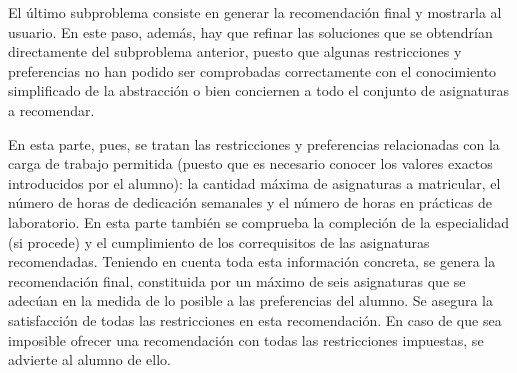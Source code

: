El último subproblema consiste en generar la recomendación final y mostrarla 
al usuario. En este paso, además, hay que refinar las soluciones que se 
obtendrían directamente del subproblema anterior, puesto que algunas 
restricciones y preferencias no han podido ser comprobadas correctamente 
con el conocimiento simplificado de la abstracción o bien conciernen a todo 
el conjunto de asignaturas a recomendar. 

En esta parte, pues, se tratan las restricciones y preferencias relacionadas 
con la carga de trabajo permitida (puesto que es necesario conocer los valores 
exactos introducidos por el alumno): la cantidad máxima de asignaturas a 
matricular, el número de horas de dedicación semanales y el número de horas 
en prácticas de laboratorio. En esta parte también se comprueba la compleción 
de la especialidad (si procede) y el cumplimiento de los correquisitos de las 
asignaturas recomendadas. Teniendo en cuenta toda esta información concreta, 
se genera la recomendación final, constituida por un máximo de seis 
asignaturas que se adecúan en la medida de lo posible a las preferencias del 
alumno. Se asegura la satisfacción de todas las restricciones en esta 
recomendación. En caso de que sea imposible ofrecer una recomendación con 
todas las restricciones impuestas, se advierte al alumno de ello.




